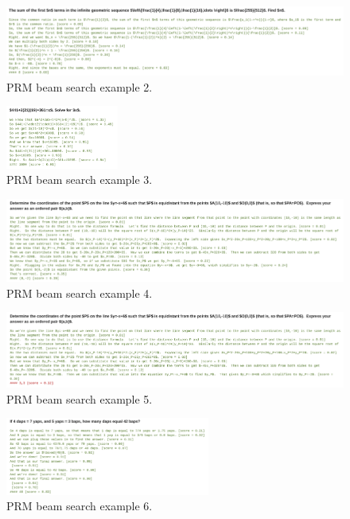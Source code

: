 \documentclass[11pt, letterpaper, logo]{googledeepmind}
\begin{document}
\begin{figure}
    \centering
    \includegraphics[width=1.0\textwidth]{PRM_ex2.png}
    \caption{PRM beam search example 2.}
    \label{fig:prm_ex2}
\end{figure}

\begin{figure}
    \includegraphics[width=0.33\textwidth]{PRM_ex3.png}
    \caption{PRM beam search example 3.}
    \label{fig:prm_ex3}
\end{figure}

\begin{figure}
    \centering
    \includegraphics[width=1.0\textwidth]{PRM_ex4.png}
    \caption{PRM beam search example 4.}
    \label{fig:prm_ex4}
\end{figure}

\begin{figure}
    \centering
    \includegraphics[width=1.0\textwidth]{PRM_ex5.png}
    \caption{PRM beam search example 5.}
    \label{fig:prm_ex5}
\end{figure}

\begin{figure}
    \includegraphics[width=0.6\textwidth]{PRM_ex6.png}
    \caption{PRM beam search example 6.}
    \label{fig:prm_ex6}
\end{figure}
\end{document}
